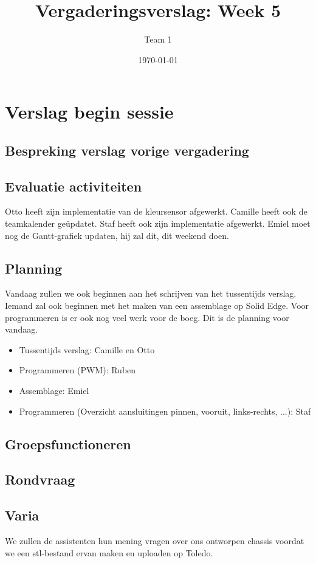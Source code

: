 \documentclass[a4paper,kulak]{kulakarticle} %
\date{\today}
\title{Vergaderingsverslag: Week 5}
\author{Team 1}
\begin{document}
\maketitle

\section{Verslag begin sessie}

\subsection{Bespreking verslag vorige vergadering}


\subsection{Evaluatie activiteiten}
Otto heeft zijn implementatie van de kleursensor afgewerkt. Camille heeft ook de teamkalender geüpdatet. Staf heeft ook zijn implementatie afgewerkt. Emiel moet nog de Gantt-grafiek updaten, hij zal dit, dit weekend doen.

\subsection{Planning}
Vandaag zullen we ook beginnen aan het schrijven van het tussentijds verslag. Iemand zal ook beginnen met het maken van een assemblage op Solid Edge. Voor programmeren is er ook nog veel werk voor de boeg. Dit is de planning voor vandaag.

\begin{itemize}
	\item Tussentijds verslag: Camille en Otto
	\item Programmeren (PWM): Ruben
	\item Assemblage: Emiel
	\item Programmeren (Overzicht aansluitingen pinnen, vooruit, links-rechts, ...): Staf  
\end{itemize}

\subsection{Groepsfunctioneren}


\subsection{Rondvraag}


\subsection{Varia}
We zullen de assistenten hun mening vragen over ons ontworpen chassis voordat we een stl-bestand ervan maken en uploaden op Toledo.
\end{document}
